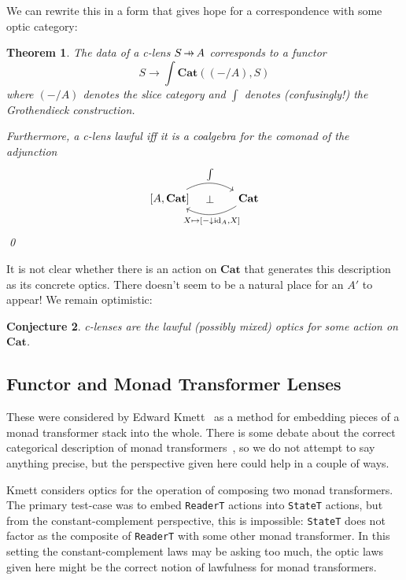 \documentclass[11pt,letterpaper]{article}
\theoremstyle{plain}
\newtheorem{theorem}{Theorem}[subsection]
\newtheorem{conjecture}[theorem]{Conjecture}
\theoremstyle{definition}
\newcommand{\Cat}{\mathbf{Cat}}
\newcommand{\id}{\mathrm{id}}
\newcommand{\hto}{\ensuremath{\,\mathaccent\shortmid\rightarrow\,}}
\newcommand{\todo}[1]{\textcolor{red}{\small #1}}
\begin{document}
We can rewrite this in a form that gives hope for a correspondence with some optic category:

\begin{theorem}
The data of a c-lens $S \hto A$ corresponds to a functor \[ S \to \int \Cat ((- / A), S) \] where $(-/A)$ denotes the slice category and $\int$ denotes (confusingly!) the Grothendieck construction.

Furthermore, a c-lens lawful iff it is a coalgebra for the comonad of the adjunction
\[
\begin{tikzcd}[column sep = large]
{[A, \Cat]} \ar[r, bend left, "\int"] \ar[r, phantom, "\bot" pos = 0.4] & \Cat \ar[l, bend left, "{X \mapsto [- \downarrow \id_A, X]}" below]
\end{tikzcd}
\]
\qed
\end{theorem}

It is not clear whether there is an action on $\Cat$ that generates this description as its concrete optics. There doesn't seem to be a natural place for an $A'$ to appear! We remain optimistic:

\begin{conjecture}
c-lenses are the lawful (possibly mixed) optics for some action on $\Cat$.
\end{conjecture}

\subsection{Functor and Monad Transformer Lenses}
These were considered by Edward Kmett~\cite{MonadTransformerLensesTalk}  as a method for embedding pieces of a monad transformer stack into the whole. There is some debate about the correct categorical description of monad transformers~\cite{MonadTransformersAsMonoidTransformers, CalculatingMonadTransformersCategoryTheory}, so we do not attempt to say anything precise, but the perspective given here could help in a couple of ways.

Kmett considers optics for the operation of composing two monad transformers. The primary test-case was to embed \texttt{ReaderT} actions into \texttt{StateT} actions, but from the constant-complement perspective, this is impossible: \texttt{StateT} does not factor as the composite of \texttt{ReaderT} with some other monad transformer. In this setting the constant-complement laws may be asking too much, the optic laws given here might be the correct notion of lawfulness for monad transformers.
\end{document}
